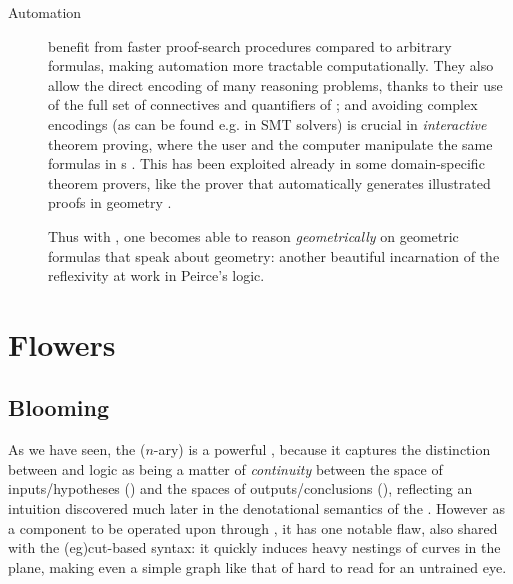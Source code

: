 \begin{scope}
\begin{description}
  \item[Automation]  benefit from faster proof-search
  procedures compared to arbitrary formulas, making automation more tractable
  computationally. They also allow the direct encoding of many reasoning
  problems, thanks to their use of the full set of connectives and quantifiers
  of ; and avoiding complex encodings (as can be found e.g. in SMT
  solvers) is crucial in \emph{interactive} theorem proving, where the user and
  the computer manipulate the same formulas in s
  . This has been exploited already in some
  domain-specific theorem provers, like the  prover that
  automatically generates illustrated proofs in geometry
  .
  
  \begin{remark}
  Thus with , one becomes able to reason \emph{geometrically} on geometric
  formulas that speak about geometry: another beautiful incarnation of the
  reflexivity at work in Peirce's  logic.
  \end{remark}
\end{description}

\section{Flowers}

\subsection{Blooming}

As we have seen, the ($n$-ary)  is a powerful
, because it captures the distinction between  and
 logic as being a matter of \emph{continuity} between the
space of inputs/hypotheses () and the spaces of outputs/conclusions
(), reflecting an intuition discovered much later in the denotational
semantics of the . However as a 
component to be operated upon through , it has one
notable flaw, also shared with the  \kl(eg){cut}-based syntax: it
quickly induces heavy nestings of curves in the plane, making even a simple
graph like that of  hard to read for an untrained eye.


\end{scope}
